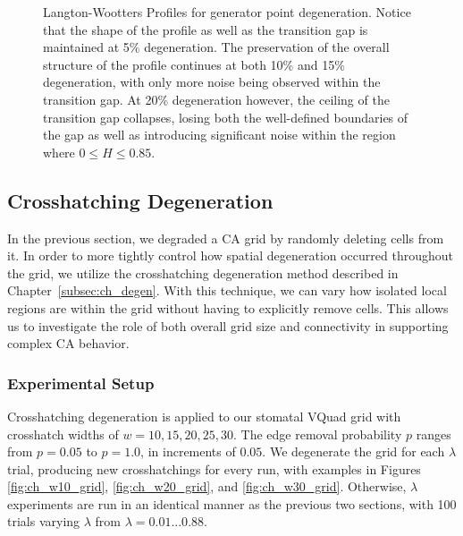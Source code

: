 \documentclass[a4paper,11pt,twoside]{report}
\begin{document}
\begin{figure}[htp]
\caption[Langton-Wootters Profile for Generator Point Degeneration]{
  Langton-Wootters Profiles for generator point degeneration. Notice that the shape of the profile as well as the transition gap is maintained at 5\% degeneration. The preservation of the overall structure of the profile continues at both 10\% and 15\% degeneration, with only more noise being observed within the transition gap. At 20\% degeneration however, the ceiling of the transition gap collapses, losing both the well-defined boundaries of the gap as well as introducing significant noise within the region where $0 \le H \le 0.85$.
}
\label{fig:lw_gen_pt_degen}
\end{figure}

\subsection{Crosshatching Degeneration}

In the previous section, we degraded a CA grid by randomly deleting cells from it. In order to more tightly control how spatial degeneration occurred throughout the grid, we utilize the crosshatching degeneration method described in Chapter~\ref{subsec:ch_degen}. With this technique, we can vary how isolated local regions are within the grid without having to explicitly remove cells. This allows us to investigate the role of both overall grid size and connectivity in supporting complex CA behavior.

\subsubsection*{Experimental Setup}
Crosshatching degeneration is applied to our stomatal VQuad grid with crosshatch widths of $w=10,15,20,25,30$. The edge removal probability $p$ ranges from $p=0.05$ to $p=1.0$, in increments of $0.05$. We degenerate the grid for each $\lambda$ trial, producing new crosshatchings for every run, with examples in Figures \ref{fig:ch_w10_grid}, \ref{fig:ch_w20_grid}, and \ref{fig:ch_w30_grid}. Otherwise, $\lambda$ experiments are run in an identical manner as the previous two sections, with 100 trials varying $\lambda$ from $\lambda=0.01...0.88$.
\end{document}

